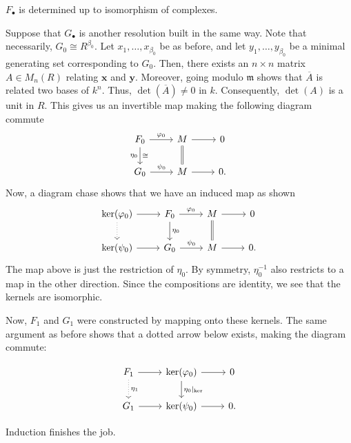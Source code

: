 \documentclass[12pt]{article}
\begin{document}
\begin{exe}
	$F_{\bullet}$ is determined up to isomorphism of complexes.
\end{exe}
\begin{soln}
	Suppose that $G_{\bullet}$ is another resolution built in the same way. Note that necessarily, $G_{0} \cong R^{\beta_{0}}$. \newline
	Let $x_{1}, \ldots, x_{\beta_{0}}$ be as before, and let $y_{1}, \ldots, y_{\beta_{0}}$ be a minimal generating set corresponding to $G_{0}$. Then, there exists an $n \times n$ matrix $A \in M_{n}(R)$ relating $\mathbf{x}$ and $\mathbf{y}$. Moreover, going modulo $\mathfrak{m}$ shows that $\overline{A}$ is related two bases of $k^{n}$. Thus, $\det(\overline{A}) \neq 0$ in $k$. Consequently, $\det(A)$ is a unit in $R$. This gives us an invertible map making the following diagram commute
	\begin{equation*} 
		\begin{tikzcd}
			F_{0} \arrow[r, "\varphi_{0}"] \arrow[d, "\cong", "\eta_{0}"'] & M \arrow[d, equals] \arrow[r] & 0 \\
			G_{0} \arrow[r, "\psi_{0}"] & M \arrow[r] & 0.
		\end{tikzcd}
	\end{equation*}
	Now, a diagram chase shows that we have an induced map as shown
	\begin{equation*} 
		\begin{tikzcd}
			\ker(\varphi_{0}) \arrow[d, dotted] \arrow[r] & F_{0} \arrow[r, "\varphi_{0}"] \arrow[d, "\eta_{0}"] & M \arrow[d, equals] \arrow[r] & 0 \\
			\ker(\psi_{0}) \arrow[r] & G_{0} \arrow[r, "\psi_{0}"] & M \arrow[r] & 0.
		\end{tikzcd}
	\end{equation*}
	The map above is just the restriction of $\eta_{0}$. By symmetry, $\eta_{0}^{-1}$ also restricts to a map in the other direction. Since the compositions are identity, we see that the kernels are isomorphic.

	Now, $F_{1}$ and $G_{1}$ were constructed by mapping onto these kernels. The same argument as before shows that a dotted arrow below exists, making the diagram commute:

	\begin{equation*} 
		\begin{tikzcd}
			F_{1} \arrow[d, "\eta_{1}", dotted] \arrow[r] & \ker(\varphi_{0}) \arrow[d, "\eta_{0}|_{\ker}"] \arrow[r] & 0 \\
			G_{1} \arrow[r] & \ker(\psi_{0}) \arrow[r] & 0.
		\end{tikzcd}
	\end{equation*}

	Induction finishes the job.
\end{soln}
\end{document}
